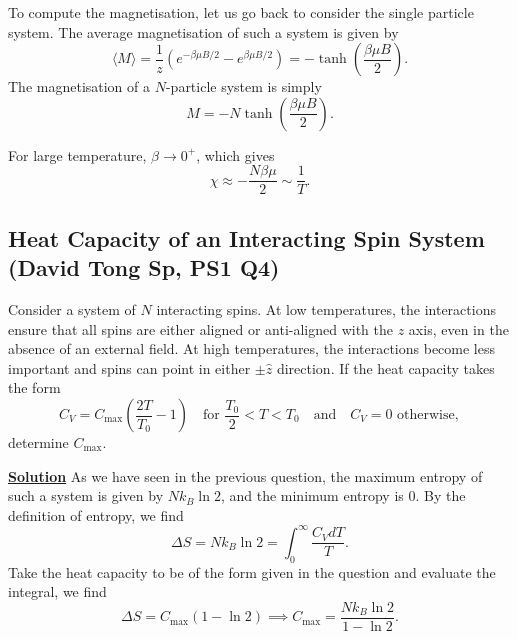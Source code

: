 To compute the magnetisation, let us go back to consider the single particle system. The average magnetisation of such a system is given by
\begin{equation}
    \langle M\rangle = \frac{1}{z}(e^{-\beta\mu B/2}- e^{\beta\mu B/2}) = -\tanh\left(\frac{\beta\mu B}{2}\right).
\end{equation}
The magnetisation of a $N$-particle system is simply
\begin{equation}
    M = -N \tanh\left(\frac{\beta\mu B}{2}\right).
\end{equation}

For large temperature, $\beta\to0^+$, which gives
\begin{equation}
    \chi \approx-\frac{N\beta\mu}{2} \sim \frac{1}{T}.
\end{equation}

\subsection{Heat Capacity of an Interacting Spin System (David Tong Sp, PS1 Q4)}
\label{sec:interacting-spins}

Consider a system of $N$ interacting spins. At low temperatures,
the interactions ensure that all spins are either aligned or anti-aligned with
the $z$ axis, even in the absence of an external field. At high temperatures,
the interactions become less important and spins can point in either
$\pm\hat{z}$ direction. If the heat capacity takes the form
\begin{equation}
  C_V = C_{\max}\!\left(\frac{2T}{T_0}-1\right)
  \quad\text{for } \frac{T_0}{2} < T < T_0
  \quad\text{and}\quad C_V = 0 \text{ otherwise},
\end{equation}
determine $C_{\max}$.

\noindent \underline{\textbf{Solution}} As we have seen in the previous question, the maximum entropy of such a system is given by $Nk_B\ln2$, and the minimum entropy is $0$. By the definition of entropy, we find
\begin{equation}
    \Delta S = Nk_B\ln2 = \int^\infty_0 \frac{C_VdT}{T}.
\end{equation}
Take the heat capacity to be of the form given in the question and evaluate the integral, we find
\begin{equation}
    \Delta S = C_\text{max}(1-\ln2) \implies C_\text{max} = \frac{Nk_B\ln2}{1-\ln2}.
\end{equation}